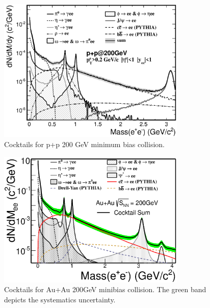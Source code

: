 \begin{figure}
\begin{centering}
\includegraphics[width=0.8\textwidth]{fig/3.Analysis/cocktail/bcCocktail}
\par\end{centering}

\protect\caption{Cocktails for p+p 200 GeV minimum bias collision.}


\label{fig:cocktailpp}

\end{figure}


\begin{figure}
\begin{centering}
\includegraphics[width=0.8\textwidth]{fig/3.Analysis/cocktail/cocktailmb_PRL}
\par\end{centering}

\protect\caption{Cocktails for Au+Au 200GeV minibias collision. The green band depicts
the systematics uncertainty.}


\label{fig:cocktailAuAu}
\end{figure}




